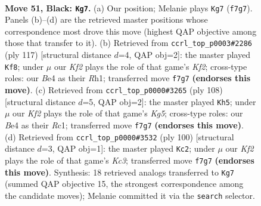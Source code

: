 \documentclass[11pt]{article}
\begin{document}
\clearpage

\begin{figure}[p]\centering
\begin{subfigure}{0.46\textwidth}\centering
\resizebox{\linewidth}{!}{%
\newchessgame
\chessboard[
  setfen={3R4/5k2/8/1pp5/4b3/8/8/5K2 b - - 7 51},
  showmover=false,
  pgfstyle=straightmove, color=movearrow, markmove={f7-g7}
]}
\caption{}
\end{subfigure}\hfill
\begin{subfigure}{0.46\textwidth}\centering
\resizebox{\linewidth}{!}{%
\newchessgame
\chessboard[
  setfen={8/5k2/8/8/4Pp2/2K5/6R1/7r b - - 15 59},
  showmover=false,
  pgfstyle=straightmove, color=movearrow, markmove={f7-f8}
]}
\caption{}
\end{subfigure}
\\[4pt]
\begin{subfigure}{0.46\textwidth}\centering
\resizebox{\linewidth}{!}{%
\newchessgame
\chessboard[
  setfen={7k/5r2/8/6K1/8/3p2P1/8/2R5 w - - 6 55},
  showmover=false,
  pgfstyle=straightmove, color=movearrow, markmove={g5-h5}
]}
\caption{}
\end{subfigure}\hfill
\begin{subfigure}{0.46\textwidth}\centering
\resizebox{\linewidth}{!}{%
\newchessgame
\chessboard[
  setfen={8/7k/1r6/7p/5B1P/2K5/8/8 w - - 0 51},
  showmover=false,
  pgfstyle=straightmove, color=movearrow, markmove={c3-c2}
]}
\caption{}
\end{subfigure}
\caption{\textbf{Move 51, Black: \texttt{Kg7}.} (a) Our position; Melanie plays \texttt{Kg7} (\texttt{f7g7}). Panels (b)--(d) are the retrieved master positions whose correspondence most drove this move (highest QAP objective among those that transfer to it). (b) Retrieved from \texttt{ccrl\_top\_p0003\#2286} (ply 117) [structural distance $d$=4, QAP obj=2]: the master played \texttt{Kf8}; under $\mu$ our \emph{Kf2} plays the role of that game's \emph{Kf2}; cross-type roles: our \emph{B}e4 as their \emph{R}h1; transferred move \texttt{f7g7} \textbf{(endorses this move)}. (c) Retrieved from \texttt{ccrl\_top\_p0000\#3265} (ply 108) [structural distance $d$=5, QAP obj=2]: the master played \texttt{Kh5}; under $\mu$ our \emph{Kf2} plays the role of that game's \emph{Kg5}; cross-type roles: our \emph{B}e4 as their \emph{R}c1; transferred move \texttt{f7g7} \textbf{(endorses this move)}. (d) Retrieved from \texttt{ccrl\_top\_p0000\#3532} (ply 100) [structural distance $d$=3, QAP obj=1]: the master played \texttt{Kc2}; under $\mu$ our \emph{Kf2} plays the role of that game's \emph{Kc3}; transferred move \texttt{f7g7} \textbf{(endorses this move)}. Synthesis: 18 retrieved analogs transferred to \texttt{Kg7} (summed QAP objective 15, the strongest correspondence among the candidate moves); Melanie committed it via the \texttt{search} selector.}
\label{fig:thought-m101}
\end{figure}
\end{document}
